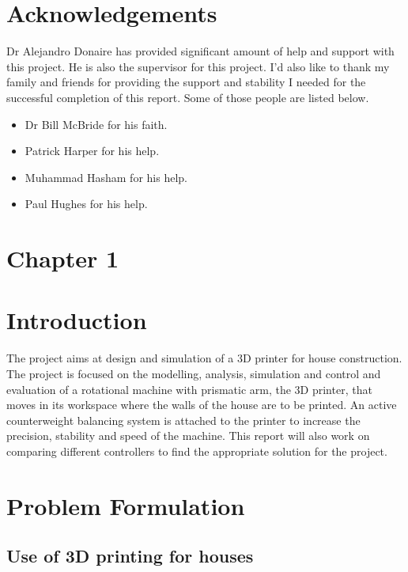\documentclass{UoNMCHA}
\numberwithin{equation}{section}
\begin{document}
	\section*{Acknowledgements}
	
	Dr Alejandro Donaire has provided significant amount of help and support with this project. He is also the supervisor for this project. I'd also like to thank my family and friends for providing the support and stability I needed for the successful completion of this report. Some of those people are listed below.
	\begin{itemize}
		\item Dr Bill McBride for his faith.
		\item Patrick Harper for his help.
		\item Muhammad Hasham for his help.
		\item Paul Hughes for his help.
		
	\end{itemize}
	
	\newpage
	\tableofcontents
	\listoffigures
	\listoftables
	\newpage
	\section*{Chapter 1}
	\section{Introduction}
	
	The project aims at design and simulation of a 3D printer for house construction. The project is focused on the modelling, analysis, simulation and control and evaluation of a rotational machine with prismatic arm, the 3D printer, that moves in its workspace where the walls of the house are to be printed. An active counterweight balancing system is attached to the printer to increase the precision, stability and speed of the machine. This report will also work on comparing different controllers to find the appropriate solution for the project.
	
	
	\section{Problem Formulation}\label{Problem Formulation}
	
	\subsection{Use of 3D printing for houses}\label{Use of 3D printing for houses}
	
\end{document}
